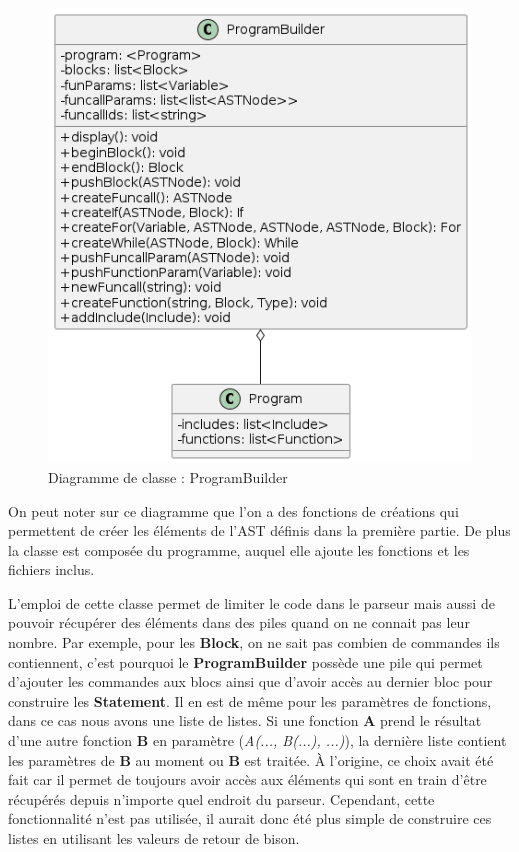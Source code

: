 \documentclass[a4paper]{article}%
\begin{document}
\begin{figure}[h]
  \begin{center}
  \includegraphics[scale=0.5]{../ressources/diagrams/program-builder.png}
  \caption{Diagramme de classe : ProgramBuilder}
  \end{center}
\end{figure}

On peut noter sur ce diagramme que l'on a des fonctions de créations qui
permettent de créer les éléments de l'AST définis dans la première partie. De
plus la classe est composée du programme, auquel elle ajoute les fonctions et les
fichiers inclus. %

L'emploi de cette classe permet de limiter le code dans le parseur mais aussi de
pouvoir récupérer des éléments dans des piles quand on ne connait pas leur
nombre. Par exemple, pour les \textbf{Block}, on ne sait pas combien de
commandes ils contiennent, c'est pourquoi le \textbf{ProgramBuilder} possède une
pile qui permet d'ajouter les commandes aux blocs ainsi que d'avoir accès au
dernier bloc pour construire les \textbf{Statement}. Il en est de même pour
les paramètres de fonctions, dans ce cas nous avons une liste de listes. Si une
fonction \textbf{A} prend le résultat d'une autre fonction \textbf{B} en
paramètre (\textit{A(..., B(...), ...)}), la dernière liste contient les
paramètres de \textbf{B} au moment ou \textbf{B} est traitée. À l'origine, ce
choix avait été fait car il permet de toujours avoir accès aux éléments qui sont
en train d'être récupérés depuis n'importe quel endroit du parseur. Cependant,
cette fonctionnalité n'est pas utilisée, il aurait donc été plus simple de
construire ces listes en utilisant les valeurs de retour de bison.\\
\end{document}
